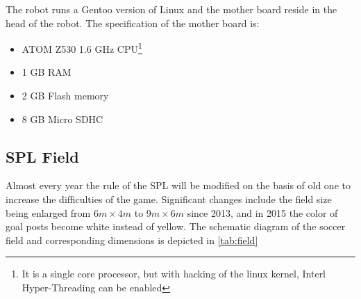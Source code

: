 The robot runs a Gentoo version of Linux and the mother board reside in the head of the robot. The specification of the mother board is:
\begin{itemize}
  \item ATOM Z530 1.6 GHz CPU\footnote{It is a single core processor, but with hacking of the linux kernel, Interl{\textregistered} Hyper-Threading can be enabled}
  \item 1 GB RAM
  \item 2 GB Flash memory
\item 8 GB Micro SDHC
\end{itemize}

\subsection{\gls{SPL} Field}
Almost every year the rule of the \gls{SPL} will be modified on the basis of old one to increase the difficulties of the game. Significant changes include the field size being enlarged from $6m \times 4m$ to $9m \times 6m$ since 2013, and in 2015 the color of goal posts become white instead of yellow. The schematic diagram of the soccer field and corresponding dimensions is depicted in \autoref{tab:field}

